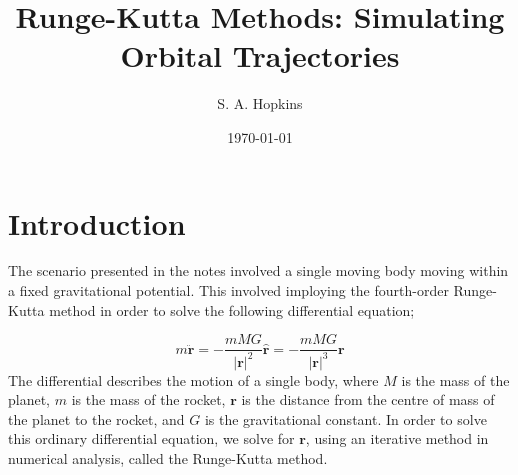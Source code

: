 \documentclass[twocolumn, prl, nobalancelastpage, aps, citeautoscript, longbibliography, 10pt]{revtex4-1}
\begin{document}
\title{Runge-Kutta Methods: Simulating Orbital Trajectories}
\author{S. A. Hopkins}
\date{\today}

\maketitle
\section{Introduction}
The scenario presented in the notes involved a single moving body moving within a fixed gravitational potential. This involved imploying the fourth-order Runge-Kutta
method in order to solve the following differential equation;

\begin{equation}
    m\ddot{\boldsymbol{r}} = -\frac{mMG}{|\boldsymbol{r}|^2}\hat{\boldsymbol{r}} = - \frac{mMG}{|\boldsymbol{r}|^3}\boldsymbol{r} 
\end{equation}
The differential describes the motion of a single body, where $M$ is the mass of the planet, $m$ is the mass of the rocket, $\boldsymbol{r}$ is the distance from the centre of mass
of the planet to the rocket, and $G$ is the gravitational constant. In order to solve this ordinary differential equation, we solve for $\boldsymbol{r}$, using an iterative method 
in numerical analysis, called the Runge-Kutta method. 
\end{document}
